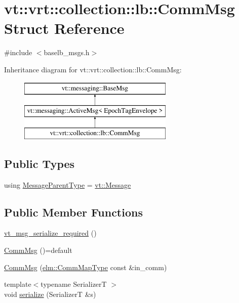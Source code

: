 \hypertarget{structvt_1_1vrt_1_1collection_1_1lb_1_1_comm_msg}{}\section{vt\+:\+:vrt\+:\+:collection\+:\+:lb\+:\+:Comm\+Msg Struct Reference}
\label{structvt_1_1vrt_1_1collection_1_1lb_1_1_comm_msg}


{\ttfamily \#include $<$baselb\+\_\+msgs.\+h$>$}

Inheritance diagram for vt\+:\+:vrt\+:\+:collection\+:\+:lb\+:\+:Comm\+Msg\+:\begin{figure}[H]
\begin{center}
\leavevmode
\includegraphics[height=3.000000cm]{structvt_1_1vrt_1_1collection_1_1lb_1_1_comm_msg}
\end{center}
\end{figure}
\subsection*{Public Types}
\begin{DoxyCompactItemize}
\item 
using \hyperlink{structvt_1_1vrt_1_1collection_1_1lb_1_1_comm_msg_a4a7be71cb2b287838d055aac29caa0ed}{Message\+Parent\+Type} = \hyperlink{namespacevt_a3a3ddfef40b4c90915fa43cdd5f129ea}{vt\+::\+Message}
\end{DoxyCompactItemize}
\subsection*{Public Member Functions}
\begin{DoxyCompactItemize}
\item 
\hyperlink{structvt_1_1vrt_1_1collection_1_1lb_1_1_comm_msg_a1c34195719e817857b58bd9a82e1f0f2}{vt\+\_\+msg\+\_\+serialize\+\_\+required} ()
\item 
\hyperlink{structvt_1_1vrt_1_1collection_1_1lb_1_1_comm_msg_ac506bdb6c343d7e1cdef5e5d7894aa7f}{Comm\+Msg} ()=default
\item 
\hyperlink{structvt_1_1vrt_1_1collection_1_1lb_1_1_comm_msg_a776e6d42457a1013604ce284775fd397}{Comm\+Msg} (\hyperlink{namespacevt_1_1elm_a38487cb8896b9b4763efa9022fab560e}{elm\+::\+Comm\+Map\+Type} const \&in\+\_\+comm)
\item 
{\footnotesize template$<$typename SerializerT $>$ }\\void \hyperlink{structvt_1_1vrt_1_1collection_1_1lb_1_1_comm_msg_afc5ab1f18e2a094f17e6905889aa90d6}{serialize} (SerializerT \&s)
\end{DoxyCompactItemize}
